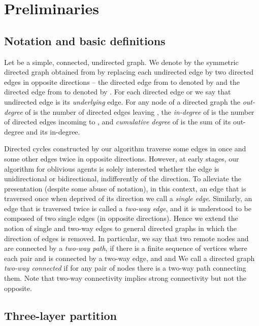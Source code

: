 \documentclass[11pt,envcountsame,oribibl]{llncs}
\begin{document}
\section{Preliminaries}

\subsection{Notation and basic definitions}


Let  be a simple, connected, undirected graph.
We denote by  the symmetric directed graph obtained
from  by replacing each undirected edge  by two directed edges
in opposite directions -- the directed edge from  to  denoted by 
and the directed edge from  to  denoted by . For each directed
edge   or  we say that undirected edge  is
its {\em underlying} edge.
For any node  of a directed graph the {\em out-degree} of  is the number
of directed edges leaving , the {\em in-degree} of  is
the number of directed edges incoming to , and {\em cumulative degree}
of  is the sum of its out-degree and its in-degree.



Directed cycles constructed by our algorithm traverse some edges in 
once and some other edges twice in opposite directions.
However, at early stages, our algorithm for oblivious agents is solely
interested whether the edge is unidirectional or bidirectional,
indifferently of the direction. To alleviate the presentation (despite some
abuse of notation), in this context, an edge that is traversed once when
deprived of its direction we call a {\sl single edge}.
Similarly, an edge that is traversed twice is called a {\sl two-way edge},
and it is understood to be composed of two single edges (in opposite directions).
Hence we extend the notion of single and two-way edges to general directed graphs
in which the direction of edges is removed. In particular,
we say that two remote nodes  and  are connected by
a {\sl two-way path}, if there is
a finite sequence of vertices 
where each pair  and  is connected by a two-way edge, and
 and 
We call a directed graph  {\em two-way connected} if for
any pair of nodes there is a two-way path connecting them.
Note that two-way connectivity implies strong connectivity but not the opposite.



\subsection{Three-layer partition\label{s:3l-partition}}
\end{document}
